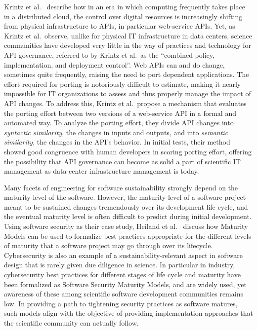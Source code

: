 \documentclass[11pt, oneside]{amsart}
\begin{document}
Krintz et al.~\cite{Krintz_WSSSPE} describe how in an era in which
computing frequently takes place in a distributed cloud, the control
over digital resources is increasingly shifting from physical
infrastructure to APIs, in particular web-service APIs. Yet, as Krintz
et al.~observe, unlike for physical IT infrastructure in data centers,
science communities have developed very little in the way of practices and
technology for API governance, referred to by Krintz et al.~as the
``combined policy, implementation, and deployment control''. Web APIs
can and do change, sometimes quite frequently, raising the need to
port dependent applications. The effort required for porting is
notoriously difficult to estimate, making it nearly impossible for IT
organizations to assess and thus properly manage the impact of API
changes. To address this, Krintz et al.~propose a mechanism that
evaluates the porting effort between two versions of a web-service API
in a formal and automated way. To analyze the porting effort, they
divide API changes into \emph{syntactic similarity}, the changes in
inputs and outputs, and into \emph{semantic similarity}, the changes
in the API's behavior. In initial tests, their method showed good
congruence with human developers in scoring porting effort, offering
the possibility that API governance can become as solid a part of
scientific IT management as data center infrastructure management is
today.

Many facets of engineering for software sustainability strongly depend
on the maturity level of the software. However, the maturity level of
a software project meant to be sustained changes tremendously over its
development life cycle, and the eventual maturity level is often
difficult to predict during initial development. Using software
security as their case study, Heiland et al.~\cite{Heiland_WSSSPE}
discuss how Maturity Models can be used to formalize best practices
appropriate for the different levels of maturity that a software
project may go through over its lifecycle. Cybersecurity is also an
example of a sustainability-relevant aspect in software design that is
rarely given due diligence in science. In particular in industry,
cybersecurity best practices for different stages of life cycle and
maturity have been formalized as Software Security Maturity Models,
and are widely used, yet awareness of these among scientific software
development communities remains low. In providing a path to tightening
security practices as software matures, such models align with the
objective of providing implementation approaches that the scientific
community can actually follow.
\end{document}
